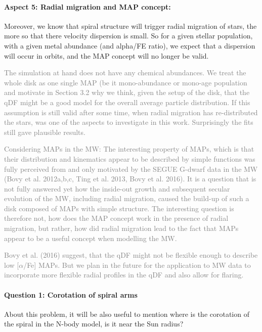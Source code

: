 \documentclass[10pt,a4paper]{article}
\newcommand{\Answer}[1]{\textcolor{Gray}{#1}}
\begin{document}
\paragraph{Aspect 5: Radial migration and MAP concept:} Moreover, we know that spiral structure will trigger radial migration of stars, the
more so that there velocity dispersion is small. So for a given stellar population,
with a given metal abundance (and alpha/FE ratio), we expect that a dispersion will
occur in orbits, and the MAP concept will no longer be valid. 

\Answer{The simulation at hand does not have any chemical abundances. We treat the whole disk as one single MAP (be it mono-abundance or mono-age population and motivate in Section 3.2 why we think, given the setup of the disk, that the qDF might be a good model for the overall average particle distribution. If this assumption is still valid after some time, when radial migration has re-distributed the stars, was one of the aspects to investigate in this work. Surprisingly the fits still gave plausible results.}

\Answer{Considering MAPs in the MW: The interesting property of MAPs, which is that their distribution and kinematics appear to be described by simple functions was fully perceived from and only motivated by the SEGUE G-dwarf data in the MW (Bovy et al. 2012a,b,c, Ting et al. 2013, Bovy et al. 2016). It is a question that is not fully answered yet how the inside-out growth and subsequent secular evolution of the MW, including radial migration, caused the build-up of such a disk composed of MAPs with simple structure. The interesting question is therefore not, how does the MAP concept work in the presence of radial migration, but rather, how did radial migration lead to the fact that MAPs appear to be a useful concept when modelling the MW.}

\Answer{Bovy et al. (2016) suggest, that the qDF might not be flexible enough to describe low [$\alpha$/Fe] MAPs. But we plan in the future for the application to MW data to incorporate more flexible radial profiles in the qDF and also allow for flaring.}

\paragraph{Question 1: Corotation of spiral arms} About this problem, it will be also useful to mention where is the corotation of the
spiral in the N-body model, is it near the Sun radius?
\end{document}
